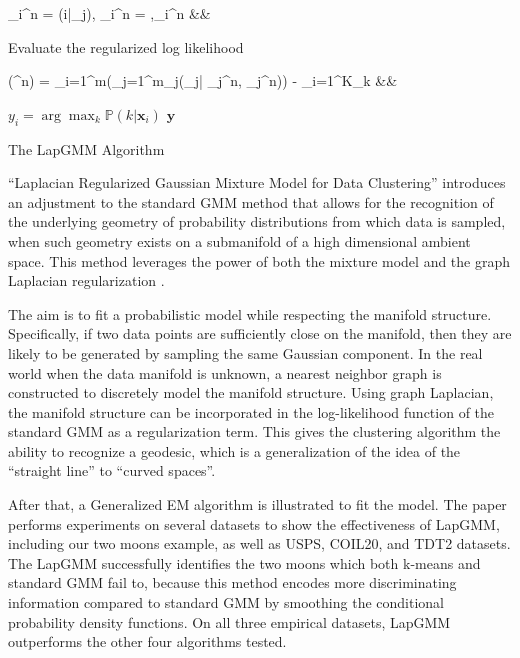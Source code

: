 \documentclass[10pt,journal,compsoc]{IEEEtran}
\begin{document}
\begin{algorithm*}
{{\begin{flalign}
                \alpha_i^n = (i|_j),\quad 
                \mu_i^n = ,\quad \Sigma_i^n &&
            \end{flalign}\;
            Evaluate the regularized log likelihood
            \begin{flalign}
                (\Theta^n) = \sum_{i=1}^m\log\left(\sum_{j=1}^m\alpha_j(_j| \mu_j^n, \Sigma_j^n)\right) - \lambda \sum_{i=1}^K_k &&
            \end{flalign}
            }
            \;
        }
        $y_i = \arg\max_k \mathbb{P}(k|\mathbf{x}_i)$\;
        \Return $\mathbf{y}$
        \caption{The LapGMM Algorithm}\label{algo:lapgmm}
    \end{algorithm*}
    
    “Laplacian Regularized Gaussian Mixture Model for Data Clustering” introduces an adjustment to the standard GMM method that allows for the recognition of the underlying geometry of probability distributions from which data is sampled, when such geometry exists on a submanifold of a high dimensional ambient space. This method leverages the power of both the mixture model and the graph Laplacian regularization \cite{he2010laplacian}.
    
    The aim is to fit a probabilistic model while respecting the manifold structure. Specifically, if two data points are sufficiently close on the manifold, then they are likely to be generated by sampling the same Gaussian component. In the real world when the data manifold is unknown, a nearest neighbor graph is constructed to discretely model the manifold structure. Using graph Laplacian, the manifold structure can be incorporated in the log-likelihood function of the standard GMM as a regularization term. This gives the clustering algorithm the ability to recognize a geodesic, which is a generalization of the idea of the “straight line” to “curved spaces”.
    
    After that, a Generalized EM algorithm is illustrated to fit the model. The paper \cite{he2010laplacian} performs experiments on several datasets to show the effectiveness of LapGMM, including our two moons example, as well as USPS, COIL20, and TDT2 datasets. The LapGMM successfully identifies the two moons which both k-means and standard GMM fail to, because this method encodes more discriminating information compared to standard GMM by smoothing the conditional probability density functions. On all three empirical datasets, LapGMM outperforms the other four algorithms tested.
    
\end{document}
